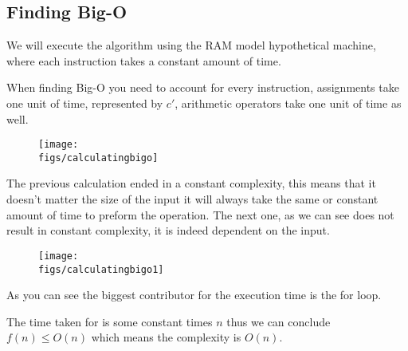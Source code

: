 \subsection{Finding Big-O}
We will execute the algorithm using the RAM model hypothetical machine, where each instruction takes a constant amount of time.
\par When finding Big-O you need to account for every instruction, assignments take one unit of time, represented by $c'$, arithmetic operators take one unit of time as well.

\begin{figure}[H]
    \centering
    \texttt{[image: \\figs/calculatingbigo]} 
\end{figure}
The previous calculation ended in a constant complexity, this means that it doesn't matter the size of the input it will always take the same or constant amount of time to preform the operation. 
The next one, as we can see does not result in constant complexity, it is indeed dependent on the input. 
\begin{figure}[H]
    \centering
    \texttt{[image: \\figs/calculatingbigo1]} 
\end{figure}
As you can see the biggest contributor for the execution time is the for loop. 
\par 
The time taken for is some constant times $n$ thus we can conclude $f(n)\leq O(n)$ which means the complexity is $O(n)$.

